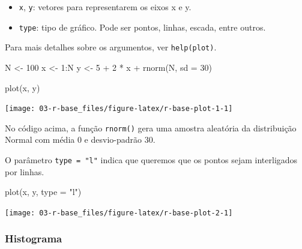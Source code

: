 \documentclass[
]{book}
\newenvironment{Shaded}{\begin{snugshade}}{\end{snugshade}}
\newcommand{\AttributeTok}[1]{\textcolor[rgb]{0.77,0.63,0.00}{#1}}
\newcommand{\DecValTok}[1]{\textcolor[rgb]{0.00,0.00,0.81}{#1}}
\newcommand{\FunctionTok}[1]{\textcolor[rgb]{0.00,0.00,0.00}{#1}}
\newcommand{\NormalTok}[1]{#1}
\newcommand{\OtherTok}[1]{\textcolor[rgb]{0.56,0.35,0.01}{#1}}
\newcommand{\SpecialCharTok}[1]{\textcolor[rgb]{0.00,0.00,0.00}{#1}}
\newcommand{\StringTok}[1]{\textcolor[rgb]{0.31,0.60,0.02}{#1}}
\providecommand{\tightlist}{%
  \setlength{\itemsep}{0pt}\setlength{\parskip}{0pt}}
\begin{document}
\begin{itemize}
\tightlist
\item
  \texttt{x}, \texttt{y}: vetores para representarem os eixos x e y.
\item
  \texttt{type}: tipo de gráfico. Pode ser pontos, linhas, escada, entre outros.
\end{itemize}

Para mais detalhes sobre os argumentos, ver \texttt{help(plot)}.

\begin{Shaded}
\begin{Highlighting}[]
\NormalTok{N }\OtherTok{\textless{}{-}} \DecValTok{100}
\NormalTok{x }\OtherTok{\textless{}{-}} \DecValTok{1}\SpecialCharTok{:}\NormalTok{N}
\NormalTok{y }\OtherTok{\textless{}{-}} \DecValTok{5} \SpecialCharTok{+} \DecValTok{2} \SpecialCharTok{*}\NormalTok{ x }\SpecialCharTok{+} \FunctionTok{rnorm}\NormalTok{(N, }\AttributeTok{sd =} \DecValTok{30}\NormalTok{)}

\FunctionTok{plot}\NormalTok{(x, y)}
\end{Highlighting}
\end{Shaded}

\begin{center}\texttt{[image: 03-r-base\_files/figure-latex/r-base-plot-1-1]} \end{center}

No código acima, a função \texttt{rnorm()} gera uma amostra aleatória da distribuição Normal com média 0 e desvio-padrão 30.

O parâmetro \texttt{type\ =\ "l"} indica que queremos que os pontos sejam interligados por linhas.

\begin{Shaded}
\begin{Highlighting}[]
\FunctionTok{plot}\NormalTok{(x, y, }\AttributeTok{type =} \StringTok{"l"}\NormalTok{)}
\end{Highlighting}
\end{Shaded}

\begin{center}\texttt{[image: 03-r-base\_files/figure-latex/r-base-plot-2-1]} \end{center}

\hypertarget{histograma}{%
\subsubsection*{Histograma}\label{histograma}}
\end{document}
